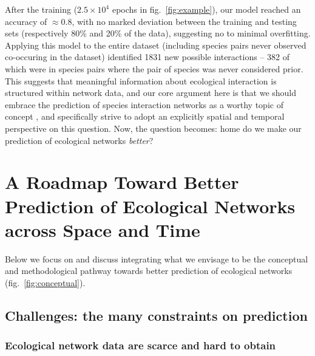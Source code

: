 \documentclass[11pt]{article}
\begin{document}
After the training (\(2.5\times 10^4\) epochs in
fig.~\ref{fig:example}), our model reached an accuracy of
\(\approx 0.8\), with no marked deviation between the training and
testing sets (respectively 80\% and 20\% of the data), suggesting no to
minimal overfitting. Applying this model to the entire dataset
(including species pairs never observed co-occuring in the dataset)
identified 1831 new possible interactions -- 382 of which were in
species pairs where the pair of species was never considered prior. This
suggests that meaningful information about ecological interaction is
structured within network data, and our core argument here is that we
should embrace the prediction of species interaction networks as a
worthy topic of concept , and specifically strive to adopt an explicitly
spatial and temporal perspective on this question. Now, the question
becomes: home do we make our prediction of ecological networks
\emph{better}?

\hypertarget{a-roadmap-toward-better-prediction-of-ecological-networks-across-space-and-time}{%
\section{A Roadmap Toward Better Prediction of Ecological Networks
across Space and
Time}\label{a-roadmap-toward-better-prediction-of-ecological-networks-across-space-and-time}}

Below we focus on and discuss integrating what we envisage to be the
conceptual and methodological pathway towards better prediction of
ecological networks (fig.~\ref{fig:conceptual}).

\hypertarget{challenges-the-many-constraints-on-prediction}{%
\subsection{Challenges: the many constraints on
prediction}\label{challenges-the-many-constraints-on-prediction}}

\hypertarget{ecological-network-data-are-scarce-and-hard-to-obtain}{%
\subsubsection{Ecological network data are scarce and hard to
obtain}\label{ecological-network-data-are-scarce-and-hard-to-obtain}}
\end{document}
